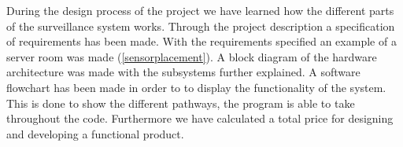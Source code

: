 During the design process of the project  we have learned how the different parts of the surveillance system works.\newline
Through the project description a specification of requirements has been made. With the requirements specified an example of a server room was made (\ref{sensorplacement}).\newline 
A block diagram of the hardware architecture was made with the subsystems further explained.
A software flowchart has been made in order to to display the functionality of the system. This is done to show the different pathways, the program is able to take throughout the code.\newline
Furthermore we have calculated a total price for designing and developing a functional product. 